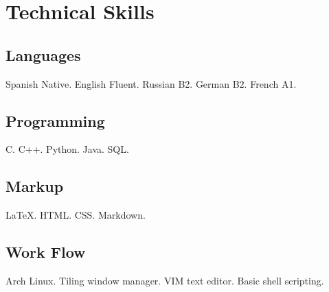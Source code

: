 \section{Technical Ski\textcolor{mycolor}{lls}}
  \subsection{Languages} 
  Spanish \textcolor{mycolor}{Native}. English \textcolor{mycolor}{Fluent}. Russian \textcolor{mycolor}{B2}. German \textcolor{mycolor}{B2}. French \textcolor{mycolor}{A1}.
  \subsection{Programming}
    C. C++. Python. Java. SQL.
  \subsection{Markup}
    {\LaTeX}. HTML. CSS. Markdown.
  \subsection{Work Flow}
    Arch Linux. Tiling window manager. VIM text editor. Basic shell scripting.
